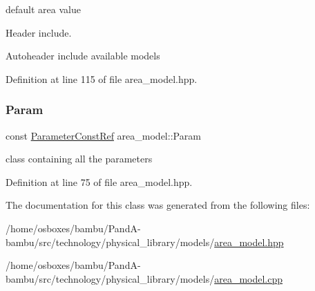 default area value 

Header include.

Autoheader include available models 

Definition at line 115 of file area\+\_\+model.\+hpp.

\mbox{\label{classarea__model_a33c8e77773f9fa818980e4b35e8d8851}} 
\subsubsection{\texorpdfstring{Param}{Param}}
{\footnotesize\ttfamily const \hyperlink{Parameter_8hpp_a37841774a6fcb479b597fdf8955eb4ea}{Parameter\+Const\+Ref} area\+\_\+model\+::\+Param\hspace{0.3cm}{\ttfamily [protected]}}



class containing all the parameters 



Definition at line 75 of file area\+\_\+model.\+hpp.



The documentation for this class was generated from the following files\+:\begin{DoxyCompactItemize}
\item 
/home/osboxes/bambu/\+Pand\+A-\/bambu/src/technology/physical\+\_\+library/models/\hyperlink{area__model_8hpp}{area\+\_\+model.\+hpp}\item 
/home/osboxes/bambu/\+Pand\+A-\/bambu/src/technology/physical\+\_\+library/models/\hyperlink{area__model_8cpp}{area\+\_\+model.\+cpp}\end{DoxyCompactItemize}
